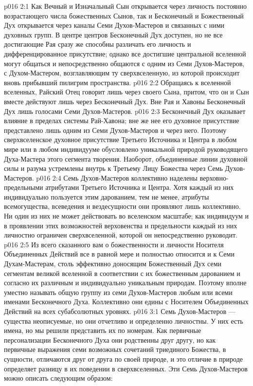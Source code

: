 \vs p016 2:1 Как Вечный и Изначальный Сын открывается через личность постоянно возрастающего числа божественных Сынов, так и Бесконечный и Божественный Дух открывается через каналы Семи Духов\hyp{}Мастеров и связанных с ними духовных групп. В центре центров Бесконечный Дух доступен, но не все достигающие Рая сразу же способны различать его личность и дифференцированное присутствие; однако все достигшие центральной вселенной могут общаться и непосредственно общаются с одним из Семи Духов\hyp{}Мастеров, с Духом\hyp{}Мастером, возглавляющим ту сверхвселенную, из которой происходит вновь прибывший пилигрим пространства.
\vs p016 2:2 Обращаясь к вселенной вселенных, Райский Отец говорит лишь через своего Сына, притом, что он и Сын вместе действуют лишь через Бесконечный Дух. Вне Рая и Хавоны Бесконечный Дух  лишь голосами Семи Духов\hyp{}Мастеров.
\vs p016 2:3 \pc Бесконечный Дух оказывает влияние  в пределах системы Рай\hyp{}Хавона; вне же нее его духовное присутствие представлено лишь одним из Семи Духов\hyp{}Мастеров и через него. Поэтому сверхвселенское духовное присутствие Третьего Источника и Центра в любом мире или в любом индивидууме обусловлено уникальной природой руководящего Духа\hyp{}Мастера этого сегмента творения. Наоборот, объединенные линии духовной силы и разума устремлены внутрь к Третьему Лицу Божества через Семь Духов\hyp{}Мастеров.
\vs p016 2:4 \pc Семь Духов\hyp{}Мастеров коллективно наделены верховно\hyp{}предельными атрибутами Третьего Источника и Центра. Хотя каждый из них индивидуально пользуется этим дарованием, тем не менее, атрибуты всемогущества, всеведения и вездесущности они проявляют лишь коллективно. Ни один из них не может действовать во вселенском масштабе; как индивидуум и в проявлении этих возможностей верховенства и предельности каждый из них личностно ограничен сверхвселенной, которой он непосредственно руководит.
\vs p016 2:5 Из всего сказанного вам о божественности и личности Носителя Объединенных Действий все в равной мере и полностью относится и к Семи Духам\hyp{}Мастерам, столь эффективно доносящим Божественный Дух семи сегментам великой вселенной в соответствии с их божественным дарованием и согласно их различным и индивидуально уникальным природам. Поэтому вполне уместно называть общую группу из семи Духов\hyp{}Мастеров любым или всеми именами Бесконечного Духа. Коллективно они едины с Носителем Объединенных Действий на всех субабсолютных уровнях.
\vs p016 3:1 Семь Духов\hyp{}Мастеров --- существа неописуемые, но они отчетливо и определенно личностны. У них есть имена, но мы решили представить их по номерам. Как первичные персонализации Бесконечного Духа они родственны друг другу, но как первичные выражения семи возможных сочетаний триединого Божества, в сущности, отличаются друг от друга по своей природе, и это отличие в природе определяет разницу в их поведении в сверхвселенных. Эти Семь Духов\hyp{}Мастеров можно описать следующим образом:
